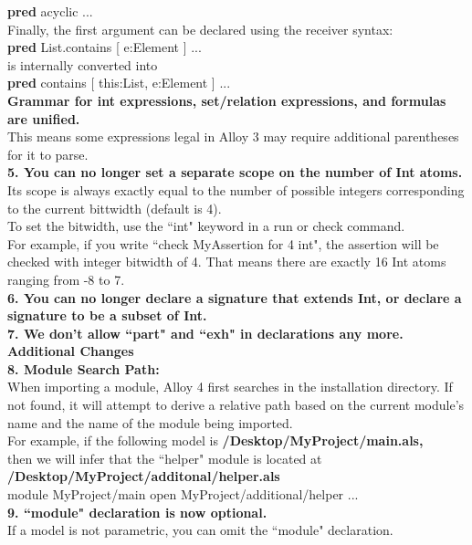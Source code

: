 \documentclass[a4paper,12pt]{extarticle}
\begin{document}
    \textbf{pred} acyclic {...} \\
Finally, the first argument can be declared using the receiver syntax:\\
    \textbf{pred} List.contains [ e:Element ] {...}\\
is internally converted into\\
   \textbf{pred} contains [ this:List, e:Element ] {...}\\
  \textbf{ Grammar for int expressions, set/relation expressions, and formulas are unified.}\\
This means some expressions legal in Alloy 3 may require additional parentheses for it to parse. \\

\textbf{5. You can no longer set a separate scope on the number of Int atoms. } \\
Its scope is always exactly equal to the number of possible integers corresponding to the current bittwidth (default is 4). \\
To set the bitwidth, use the ``int" keyword in a run or check command. \\
For example, if you write ``check MyAssertion for 4 int", the assertion will be checked with integer bitwidth of 4. That means there are exactly 16 Int atoms ranging from -8 to 7.\\
\textbf{6. You can no longer declare a signature that extends Int, or declare a signature to be a subset of Int. }\\
\textbf{7. We don't allow ``part" and ``exh" in declarations any more. }\\
\textbf{Additional Changes }\\
\textbf{8. Module Search Path: }\\
When importing a module, Alloy 4 first searches in the installation directory. If not found, it will attempt to derive a relative path based on the current module's name and the name of the module being imported. \\
For example, if the following model is \textbf{/Desktop/MyProject/main.als,}\\
then we will infer that the ``helper" module is located at \textbf{/Desktop/MyProject/additonal/helper.als} \\
   module MyProject/main
   open MyProject/additional/helper
   ...\\
 \textbf{9. ``module" declaration is now optional. } \\
If a model is not parametric, you can omit the ``module" declaration. \\
\end{document}
